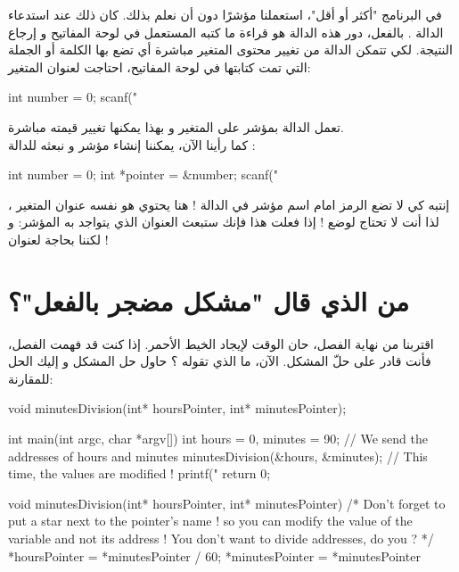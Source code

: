 في البرنامج "أكثر أو أقل"، استعملنا مؤشرًا دون أن نعلم بذلك. كان ذلك عند استدعاء الدالة
.
بالفعل، دور هذه الدالة هو قراءة ما كتبه المستعمل في لوحة المفاتيح و إرجاع النتيجة. لكي تتمكن الدالة من تغيير محتوى المتغير مباشرة أي تضع بها الكلمة أو الجملة التي تمت كتابتها في لوحة المفاتيح، احتاجت لعنوان المتغير:

\begin{Csource}
int number = 0;
scanf("%
\end{Csource}

تعمل الدالة بمؤشر على المتغير
و بهذا يمكنها تغيير قيمته مباشرة.\\
كما رأينا الآن، يمكننا إنشاء مؤشر و نبعثه للدالة
:

\begin{Csource}
int number = 0;
int *pointer = &number;
scanf("%
\end{Csource}

إنتبه كي لا تضع الرمز
\InlineCode{\&}
امام اسم مؤشر في الدالة
!
هنا
يحتوي هو نفسه عنوان المتغير
،
لذا أنت لا تحتاج لوضع
\InlineCode{\&}!
إذا فعلت هذا فإنك ستبعث العنوان الذي يتواجد به المؤشر: و لكننا بحاجة لعنوان
!

\section{من الذي قال "مشكل مضجر بالفعل"؟}

اقتربنا من نهاية الفصل، حان الوقت لإيجاد الخيط الأحمر. إذا كنت قد فهمت الفصل، فأنت قادر على حلّ المشكل. الآن، ما الذي تقوله ؟ حاول حل المشكل و إليك الحل للمقارنة:

\begin{Csource}
void minutesDivision(int* hoursPointer, int* minutesPointer);

int main(int argc, char *argv[])
{
	int hours = 0, minutes = 90;
	// We send the addresses of hours and minutes
	minutesDivision(&hours, &minutes);
	// This time, the values are modified !
	printf("%
	return 0;
}

void minutesDivision(int* hoursPointer, int* minutesPointer)
{
	/* Don't forget to put a star next to the pointer's name ! so you can modify the value of the variable and not its address ! You don't want to divide addresses, do you ? */
	*hoursPointer = *minutesPointer / 60;
	*minutesPointer = *minutesPointer %
}
\end{Csource}

